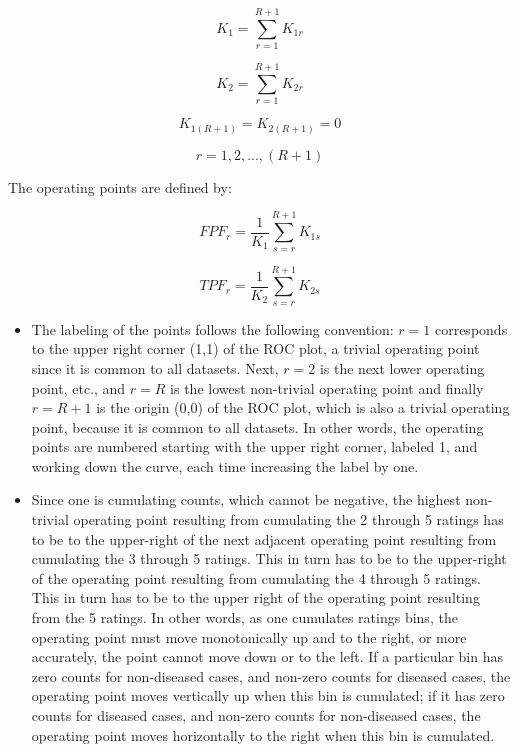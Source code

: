 \documentclass[
]{book}
\begin{document}
\begin{equation*} 
K_1=\sum_{r=1}^{R+1}K_{1r}
\end{equation*}

\begin{equation*} 
K_2=\sum_{r=1}^{R+1}K_{2r}
\end{equation*}

\begin{equation*} 
K_{1{(R+1)}} = K_{2{(R+1)}} = 0
\end{equation*}

\begin{equation*} 
r = 1,2,...,(R+1)
\end{equation*}

The operating points are defined by:

\begin{equation*} 
FPF_r=\frac {1} {K_1} \sum_{s=r}^{R+1}K_{1s}
\end{equation*}

\begin{equation*} 
TPF_r=\frac {1} {K_2} \sum_{s=r}^{R+1}K_{2s}
\end{equation*}

\begin{itemize}
\item
  The labeling of the points follows the following convention: \(r=1\) corresponds to the upper right corner (1,1) of the ROC plot, a trivial operating point since it is common to all datasets. Next, \(r=2\) is the next lower operating point, etc., and \(r=R\) is the lowest non-trivial operating point and finally \(r=R+1\) is the origin (0,0) of the ROC plot, which is also a trivial operating point, because it is common to all datasets. In other words, the operating points are numbered starting with the upper right corner, labeled 1, and working down the curve, each time increasing the label by one.
\item
  Since one is cumulating counts, which cannot be negative, the highest non-trivial operating point resulting from cumulating the 2 through 5 ratings has to be to the upper-right of the next adjacent operating point resulting from cumulating the 3 through 5 ratings. This in turn has to be to the upper-right of the operating point resulting from cumulating the 4 through 5 ratings. This in turn has to be to the upper right of the operating point resulting from the 5 ratings. In other words, as one cumulates ratings bins, the operating point must move monotonically up and to the right, or more accurately, the point cannot move down or to the left. If a particular bin has zero counts for non-diseased cases, and non-zero counts for diseased cases, the operating point moves vertically up when this bin is cumulated; if it has zero counts for diseased cases, and non-zero counts for non-diseased cases, the operating point moves horizontally to the right when this bin is cumulated.
\end{itemize}
\end{document}
